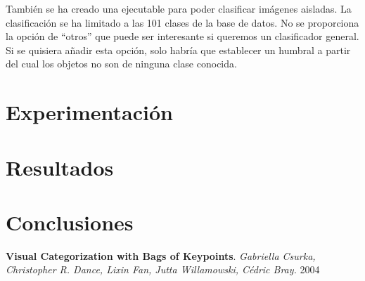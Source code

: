 \documentclass[a4paper,12pt]{article}
\begin{document}
También se ha creado una ejecutable para poder clasificar imágenes aisladas.
La clasificación se ha limitado a las 101 clases de la base de datos. No se 
proporciona la opción de ``otros'' que puede ser interesante si queremos un 
clasificador general. Si se quisiera añadir esta opción, solo habría que 
establecer un humbral a partir del cual los objetos no son de ninguna clase 
conocida.

\newpage
\section{Experimentación}

\newpage
\section{Resultados}

\newpage
\section{Conclusiones}


\newpage
\begin{thebibliography}{99}

 \textbf{Visual Categorization with Bags of Keypoints}. 
 \emph{Gabriella Csurka, Christopher R. Dance, Lixin Fan, Jutta Willamowski, Cédric Bray.}
 2004 

\end{thebibliography}
\end{document}
